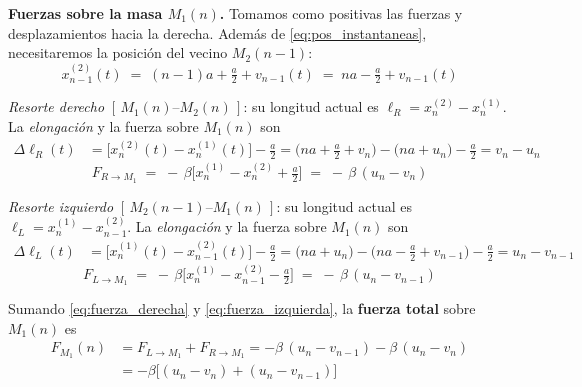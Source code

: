 \documentclass{article}
\begin{document}
\textcolor{Tarawera}{\textbf{Fuerzas sobre la masa \(M_{1}(n)\).}}
Tomamos como positivas las fuerzas y desplazamientos hacia la derecha. Además de \eqref{eq:pos_instantaneas},
necesitaremos la posición del vecino \(M_{2}(n-1)\):
\begin{equation}
x_{n-1}^{(2)}(t) \;=\; (n-1)a + \tfrac{a}{2} + v_{n-1}(t) \;=\; n a - \tfrac{a}{2} + v_{n-1}(t)
\label{eq:pos_m2_n_1}
\end{equation}

\emph{Resorte derecho} \([\,M_{1}(n)\text{--}M_{2}(n)\,]\): su longitud actual es \(\ell_{R}=x_{n}^{(2)}-x_{n}^{(1)}\).
La \emph{elongación} y la fuerza sobre \(M_{1}(n)\) son
\begin{equation}
\begin{split}
\Delta\ell_{R}(t) 
&= \big[x_{n}^{(2)}(t)-x_{n}^{(1)}(t)\big]-\tfrac{a}{2} 
= \Big(n a + \tfrac{a}{2} + v_{n}\Big)-\Big(n a + u_{n}\Big)-\tfrac{a}{2} 
= v_{n}-u_{n}
\end{split}
\label{eq:elongacion_derecha}
\end{equation}
\begin{equation}
F_{R\to M_1} \;=\; -\,\beta\Big[x_{n}^{(1)}-x_{n}^{(2)}+\tfrac{a}{2}\Big]
\;=\; -\,\beta\,(u_{n}-v_{n})
\label{eq:fuerza_derecha}
\end{equation}

\emph{Resorte izquierdo} \([\,M_{2}(n-1)\text{--}M_{1}(n)\,]\): su longitud actual es \(\ell_{L}=x_{n}^{(1)}-x_{n-1}^{(2)}\).
La \emph{elongación} y la fuerza sobre \(M_{1}(n)\) son
\begin{equation}
\begin{split}
\Delta\ell_{L}(t) 
&= \big[x_{n}^{(1)}(t)-x_{n-1}^{(2)}(t)\big]-\tfrac{a}{2} 
= \Big(n a + u_{n}\Big)-\Big(n a - \tfrac{a}{2} + v_{n-1}\Big)-\tfrac{a}{2} 
= u_{n}-v_{n-1}
\end{split}
\label{eq:elongacion_izquierda}
\end{equation}
\begin{equation}
F_{L\to M_1} \;=\; -\,\beta\Big[x_{n}^{(1)}-x_{n-1}^{(2)}-\tfrac{a}{2}\Big]
\;=\; -\,\beta\,(u_{n}-v_{n-1})
\label{eq:fuerza_izquierda}
\end{equation}

Sumando \eqref{eq:fuerza_derecha} y \eqref{eq:fuerza_izquierda}, la \textbf{fuerza total} sobre \(M_{1}(n)\) es
\begin{equation}
\begin{split}
F_{M_{1}}(n) 
&= F_{L\to M_1} + F_{R\to M_1} 
= -\beta\,(u_{n}-v_{n-1}) - \beta\,(u_{n}-v_{n}) \\[2pt]
&= -\beta\Big[(u_{n}-v_{n}) + (u_{n}-v_{n-1})\Big]
\end{split}
\label{eq:F_M1}
\end{equation}
\end{document}
